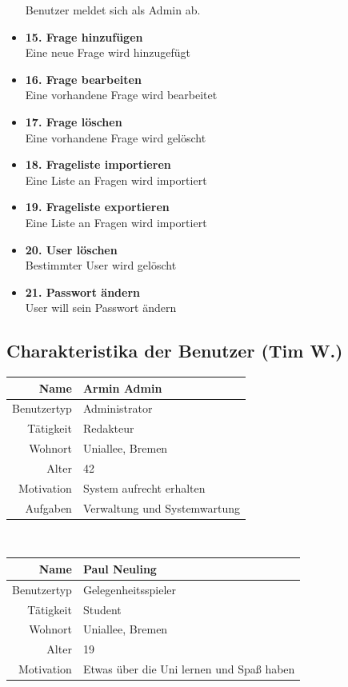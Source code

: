 \documentclass[fontsize=12pt,paper=a4,twoside]{scrartcl}
\begin{document}
\begin{itemize}
	Benutzer meldet sich als Admin ab.
	\item \textbf{15. Frage hinzufügen}\\
	Eine neue Frage wird hinzugefügt
	\item \textbf{16. Frage bearbeiten}\\
	Eine vorhandene Frage wird bearbeitet
	\item \textbf{17. Frage löschen}\\
	Eine vorhandene Frage wird gelöscht
		\item \textbf{18. Frageliste importieren}\\
		Eine Liste an Fragen wird importiert
		\item \textbf{19. Frageliste exportieren}\\
		Eine Liste an Fragen wird importiert
	\item \textbf{20. User löschen}\\
	Bestimmter User wird gelöscht
	\item \textbf{21. Passwort ändern}\\
	User will sein Passwort ändern	
\end{itemize}

\subsection{Charakteristika der Benutzer (Tim W.)}
	\begin{tabular}{|r|p{}|}\hline
       \textbf{Name} &  \textbf{Armin Admin}\\\hline
       Benutzertyp & Administrator\\\hline
       Tätigkeit	& Redakteur\\\hline
       Wohnort & Uniallee, Bremen\\\hline
       Alter	 & 42\\\hline
       Motivation & System aufrecht erhalten\\\hline
       Aufgaben & Verwaltung und Systemwartung\\\hline
    \end{tabular}\\
        
    	\begin{tabular}{|r|p{}|}\hline
        \textbf{Name} &  \textbf{Paul Neuling}\\\hline
       Benutzertyp & Gelegenheitsspieler \\\hline
       Tätigkeit	& Student\\\hline
       Wohnort & Uniallee, Bremen\\\hline
       Alter	 & 19\\\hline
       Motivation & Etwas über die Uni lernen und Spaß haben\\\hline
    \end{tabular}\\
    
\end{document}
